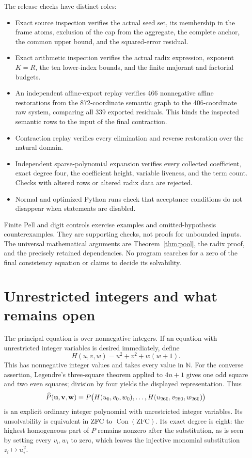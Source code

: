 \documentclass[11pt]{article}
\theoremstyle{definition}\newtheorem{definition}[theorem]{Definition}
\theoremstyle{remark}\newtheorem{remark}[theorem]{Remark}
\newcommand{\N}{\mathbb N}\newcommand{\Z}{\mathbb Z}
\newcommand{\Con}{\operatorname{Con}}\newcommand{\Refut}{\operatorname{Ref}}
\newcommand{\code}[1]{\texttt{\detokenize{#1}}}
\begin{document}
The release checks have distinct roles:
\begin{itemize}
\item Exact source inspection verifies the actual seed set, its membership in the frame atoms, exclusion of the cap from the aggregate, the complete anchor, the common upper bound, and the squared-error residual.
\item Exact arithmetic inspection verifies the actual radix expression, exponent $K=R$, the ten lower-index bounds, and the finite majorant and factorial budgets.
\item An independent affine-export replay verifies 466 nonnegative affine restorations from the 872-coordinate semantic graph to the 406-coordinate raw system, comparing all 339 exported residuals. This binds the inspected semantic rows to the input of the final contraction.
\item Contraction replay verifies every elimination and reverse restoration over the natural domain.
\item Independent sparse-polynomial expansion verifies every collected coefficient, exact degree four, the coefficient height, variable liveness, and the term count. Checks with altered rows or altered radix data are rejected.
\item Normal and optimized Python runs check that acceptance conditions do not disappear when \code{assert} statements are disabled.
\end{itemize}

Finite Pell and digit controls exercise examples and omitted-hypothesis counterexamples. They are supporting checks, not proofs for unbounded inputs. The universal mathematical arguments are Theorem~\ref{thm:pool}, the radix proof, and the precisely retained dependencies. No program searches for a zero of the final consistency equation or claims to decide its solvability.

\section{Unrestricted integers and what remains open}

The principal equation is over nonnegative integers. If an equation with unrestricted integer variables is desired immediately, define
\[
 H(u,v,w)=u^2+v^2+w(w+1).
\]
This has nonnegative integer values and takes every value in $\N$. For the converse assertion, Legendre's three-square theorem applied to $4n+1$ gives one odd square and two even squares; division by four yields the displayed representation. Thus
\begin{equation}\label{eq:integer}
 \widehat P(\mathbf u,\mathbf v,\mathbf w)
    =P\bigl(H(u_0,v_0,w_0),\ldots,H(u_{260},v_{260},w_{260})\bigr)
\end{equation}
is an explicit ordinary integer polynomial with \IntegerVars{} unrestricted integer variables. Its unsolvability is equivalent in ZFC to $\Con(\mathrm{ZFC})$. Its exact degree is eight: the highest homogeneous part of $P$ remains nonzero after the substitution, as is seen by setting every $v_i,w_i$ to zero, which leaves the injective monomial substitution $z_i\mapsto u_i^2$.
\end{document}
